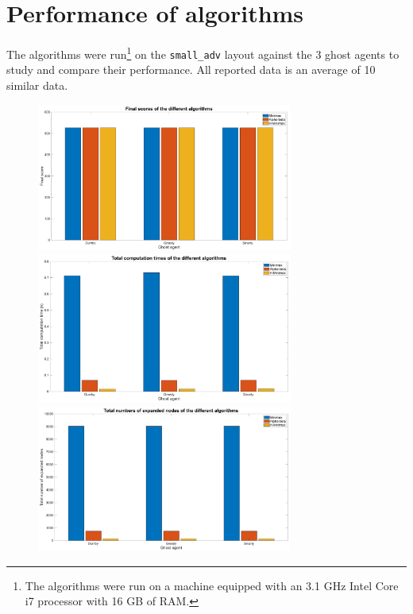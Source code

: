 \documentclass[a4paper, 11pt]{article}
\begin{document}
	
	\newpage
	
	\section{Performance of algorithms}
	The algorithms were run\footnote{The algorithms were run on a machine equipped with an 3.1 GHz Intel Core i7 processor with 16 GB of RAM.} on the \texttt{small\_adv} layout against the 3 ghost agents to study and compare their performance. All reported data is an average of 10 similar data.
	
	\begin{figure}[!ht]
	    \centering
	    \includegraphics[width=0.75\textwidth]{resources/pdf/scores.pdf}
    	\includegraphics[width=0.75\textwidth]{resources/pdf/times.pdf}
        \includegraphics[width=0.75\textwidth]{resources/pdf/nodes.pdf}
        \label{fig:plots}
    \end{figure}
	
\end{document}
